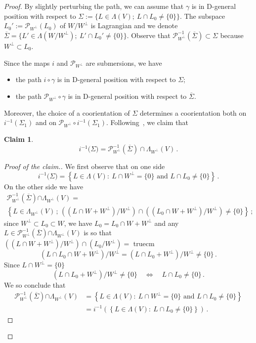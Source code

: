 \documentclass[10pt,a4paper]{amsart}
\numberwithin{equation}{section}
\renewcommand*\P{\mathcal{P}}
\theoremstyle{definition}
\newtheorem{claim}[theo]{Claim}
\theoremstyle{remark}
\newenvironment{enonce}[1]{\begin{claim}}{\end{claim}}
\begin{document}
\begin{proof}
By slightly perturbing the path, we can assume that $\gamma$ is in D-general position with respect to $\Sigma:=\{L\in\Lambda(V) ;\ L\cap L_0\neq \{0\}\}$. The subspace $L_0':= \P_{W^\perp}(L_0)$ of $W/W^\perp$ is Lagrangian and we denote $\overline{\Sigma}=\{L'\in\Lambda(W/W^\perp) ;\ L'\cap L_0'\neq\{0\}\}$. Observe that $\P_{W^\perp}^{-1}(\overline{\Sigma})\subset\Sigma$ because $W^\bot\subset L_0$.


Since the maps $i$ and $\P_{W^\perp}$ are submersions, we have
\begin{itemize}
\item the path $i\circ\gamma$ is in D-general position with respect to $\Sigma$;
\item the path $\P_{W^\perp}\circ\gamma$ is in D-general position with respect to $\overline{\Sigma}$.
\end{itemize}


Moreover, the choice of a coorientation of $\Sigma$ determines a coorientation both on $i^{-1}(\Sigma_1)$ and on $\P_{W^\perp}\circ i^{-1}(\Sigma_1)$. Following~\cite{Vit1987}, we claim that

\begin{enonce}{Claim}\label{claim23}
\[
i^{-1}({\Sigma)=
\P_{W^\perp}^{-1}(\overline{\Sigma}) \cap \Lambda_{W^\bot}(V)}\,.
\]
\end{enonce}

\begin{proof}[Proof of the claim.]We first observe that on one side
\[
i^{-1}({\Sigma)}=
\left\{ L\in\Lambda(V) :\ L\cap W^\perp=\{0\}\text{ and } L\cap L_0\neq\{0\} \right\}\,.
\]
On the other side we have
\begin{multline*}
\P_{W^\perp}^{-1}\left({\overline{\Sigma}}\right){\cap \Lambda_{W^\bot}(V)}=
\\
\left\{ L\in{ \Lambda_{W^\bot}(V)}\, ;\, \left((L\cap W+W^\perp)/W^\perp\right)\cap \left((L_0\cap W+W^\perp)/W^\perp\right)\neq \{0\} \right\}\, ;
\end{multline*}
since $W^\perp\subset L_0\subset W$, we have $L_0=L_0\cap W+W^\perp$ and any $L\in \P_{W^\perp}^{-1}({\overline{\Sigma}}){\cap \Lambda_{W^\bot}(V)}$ is so that\\
$ ((L\cap W+W^\perp)/W^\perp)\cap ({L_0 }/W^\perp)=$ truecm
\[
\left(L\cap L_0\cap W+W^\perp\right)/W^\perp=\left(L\cap L_0+W^\perp\right)/W^\perp\neq \{0\}\,.
\]
Since $L\cap W^\perp=\{0\}$
\[
\left(L\cap L_0+W^\perp\right)/W^\perp\neq \{0\}\quad\Leftrightarrow\quad L\cap L_0\neq \{0\}\,.
\]
We so conclude that
\begin{align*}
\P_{W^\perp}^{-1}({\overline{\Sigma}}){\cap \Lambda_{W^\bot}(V)}&=
\left\{ L\in \Lambda(V) :\ L\cap W^\perp=\{0\}\text{ and } L\cap L_0\neq \{0\}
\right\}\\
&=i^{-1}\left(\left\{ L\in\Lambda(V) :\ L\cap L_0\neq\{0\}\right\}\right)\,.
\end{align*}
\end{proof}



\end{proof}
\end{document}
